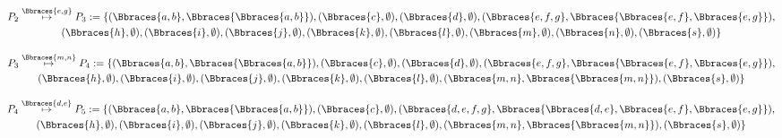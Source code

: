 \begin{solution}
\begin{enumerate}[label = \arabic*.]
    \begin{multline*}
        P_2
        \stackrel
        {
            \Bbraces{e, g}
        }{
            \mapsto
        }
        P_3 :=
        \{
            (\Bbraces{a, b}, \Bbraces{\Bbraces{a, b}}),
            (\Bbraces{c}, \emptyset),
            (\Bbraces{d}, \emptyset),
            (\Bbraces{e, f, g}, \Bbraces{\Bbraces{e, f}, \Bbraces{e, g}}), \\
            (\Bbraces{h}, \emptyset),
            (\Bbraces{i}, \emptyset),
            (\Bbraces{j}, \emptyset),
            (\Bbraces{k}, \emptyset),
            (\Bbraces{l}, \emptyset),
            (\Bbraces{m}, \emptyset),
            (\Bbraces{n}, \emptyset),
            (\Bbraces{s}, \emptyset)
        \}
    \end{multline*}

    \begin{multline*}
        P_3
        \stackrel
        {
            \Bbraces{m, n}
        }{
            \mapsto
        }
        P_4 :=
        \{
            (\Bbraces{a, b}, \Bbraces{\Bbraces{a, b}}),
            (\Bbraces{c}, \emptyset),
            (\Bbraces{d}, \emptyset),
            (\Bbraces{e, f, g}, \Bbraces{\Bbraces{e, f}, \Bbraces{e, g}}), \\
            (\Bbraces{h}, \emptyset),
            (\Bbraces{i}, \emptyset),
            (\Bbraces{j}, \emptyset),
            (\Bbraces{k}, \emptyset),
            (\Bbraces{l}, \emptyset),
            (\Bbraces{m, n}, \Bbraces{\Bbraces{m, n}}),
            (\Bbraces{s}, \emptyset)
        \}
    \end{multline*}

    \begin{multline*}
        P_4
        \stackrel
        {
            \Bbraces{d, e}
        }{
            \mapsto
        }
        P_5 :=
        \{
            (\Bbraces{a, b}, \Bbraces{\Bbraces{a, b}}),
            (\Bbraces{c}, \emptyset),
            (\Bbraces{d, e, f, g}, \Bbraces{\Bbraces{d, e}, \Bbraces{e, f}, \Bbraces{e, g}}), \\
            (\Bbraces{h}, \emptyset),
            (\Bbraces{i}, \emptyset),
            (\Bbraces{j}, \emptyset),
            (\Bbraces{k}, \emptyset),
            (\Bbraces{l}, \emptyset),
            (\Bbraces{m, n}, \Bbraces{\Bbraces{m, n}}),
            (\Bbraces{s}, \emptyset)
        \}
    \end{multline*}


\end{enumerate}
\end{solution}
